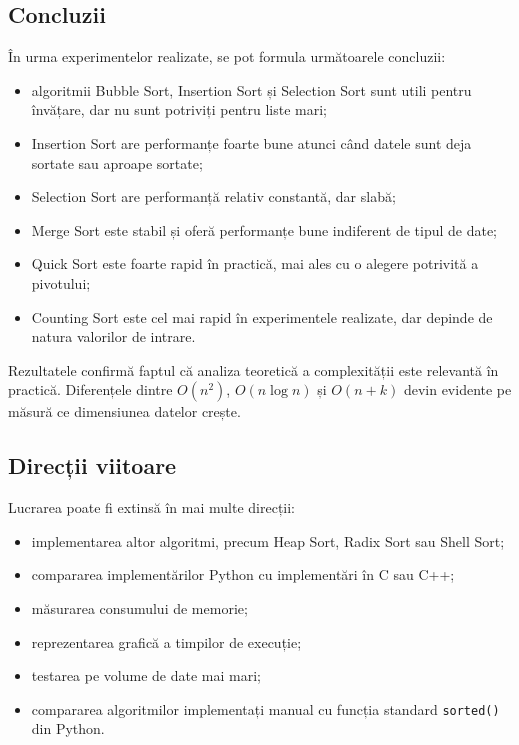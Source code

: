 \documentclass[a4paper,12pt]{article}
\begin{document}
\subsection{Concluzii}
În urma experimentelor realizate, se pot formula următoarele concluzii:
\begin{itemize}
    \item algoritmii Bubble Sort, Insertion Sort și Selection Sort sunt utili pentru învățare, dar nu sunt potriviți pentru liste mari;
    \item Insertion Sort are performanțe foarte bune atunci când datele sunt deja sortate sau aproape sortate;
    \item Selection Sort are performanță relativ constantă, dar slabă;
    \item Merge Sort este stabil și oferă performanțe bune indiferent de tipul de date;
    \item Quick Sort este foarte rapid în practică, mai ales cu o alegere potrivită a pivotului;
    \item Counting Sort este cel mai rapid în experimentele realizate, dar depinde de natura valorilor de intrare.
\end{itemize}

Rezultatele confirmă faptul că analiza teoretică a complexității este relevantă în practică. Diferențele dintre $O(n^2)$, $O(n \log n)$ și $O(n+k)$ devin evidente pe măsură ce dimensiunea datelor crește.

\subsection{Direcții viitoare}
Lucrarea poate fi extinsă în mai multe direcții:
\begin{itemize}
    \item implementarea altor algoritmi, precum Heap Sort, Radix Sort sau Shell Sort;
    \item compararea implementărilor Python cu implementări în C sau C++;
    \item măsurarea consumului de memorie;
    \item reprezentarea grafică a timpilor de execuție;
    \item testarea pe volume de date mai mari;
    \item compararea algoritmilor implementați manual cu funcția standard \texttt{sorted()} din Python.
\end{itemize}
\end{document}
